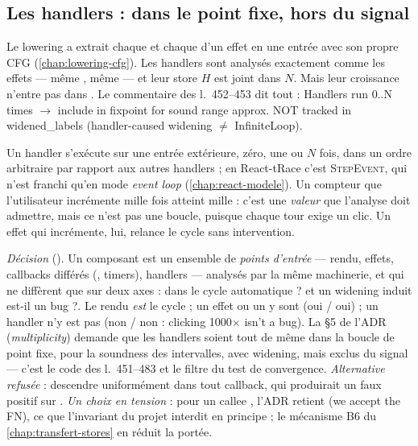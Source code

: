 \subsection{Les handlers : dans le point fixe, hors du signal}
\label{sec:point-fixe-composant-handlers}


Le lowering a extrait chaque  et chaque
 d'un effet en une entrée
 avec son propre CFG (\cref{chap:lowering-cfg}).
Les handlers sont analysés exactement comme les effets --- même
, même  --- et leur store $H$ est joint
dans $N$. Mais leur croissance n'entre pas dans . Le
commentaire des l.~452--453 dit tout : \og Handlers run 0..N times $\to$
include in fixpoint for sound range approx. NOT tracked in widened\_labels
(handler-caused widening $\neq$ InfiniteLoop)\fg.

\begin{react}[Événements]
Un handler s'exécute sur une entrée extérieure, zéro, une ou $N$ fois, dans
un ordre arbitraire par rapport aux autres handlers ; en React-tRace c'est
\textsc{StepEvent}, qui n'est franchi qu'en mode \emph{event loop}
(\cref{chap:react-modele}). Un compteur que l'utilisateur
incrémente mille fois atteint mille : c'est une \emph{valeur} que l'analyse
doit admettre, mais ce n'est pas une boucle, puisque chaque tour exige un
clic. Un effet qui incrémente, lui, relance le cycle sans intervention.
\end{react}

\begin{decision}
\emph{Décision} (). Un composant est un ensemble de \emph{points
d'entrée} --- rendu, effets, callbacks différés (, timers),
handlers --- analysés par la même machinerie, et qui ne diffèrent que sur deux
axes : \og dans le cycle automatique ?\fg{} et \og un widening induit est-il
un bug ?\fg. Le rendu \emph{est} le cycle ; un effet ou un  y sont
(oui / oui) ; un handler n'y est pas (non / non : \og clicking 1000$\times$
isn't a bug\fg). La §5 de l'ADR (\emph{multiplicity}) demande que les
handlers soient tout de même dans la boucle de point fixe, pour la
soundness des intervalles, avec widening, mais exclus du signal ---
c'est le code des l.~451--483 et le filtre  du test
de convergence. \emph{Alternative refusée} : descendre uniformément dans
tout callback, qui produirait un faux positif  sur
. \emph{Un choix
en tension} : pour un callee , l'ADR retient 
(\og we accept the FN\fg), ce que l'invariant du projet interdit en principe ;
le mécanisme B6 du \cref{chap:transfert-stores} en réduit la portée.
\end{decision}

